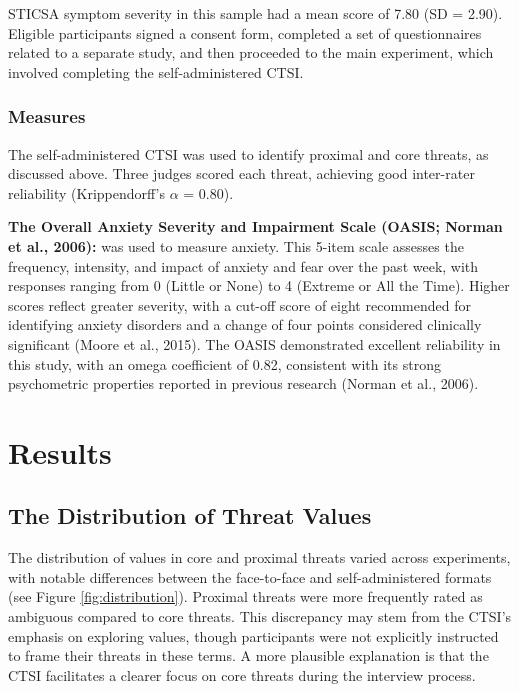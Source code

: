 \documentclass[
  man,floatsintext]{apa7}
\begin{document}
STICSA symptom severity in this sample had a mean score of 7.80 (SD = 2.90).
Eligible participants signed a consent form, completed a set of questionnaires related to a separate study, and then proceeded to the main experiment, which involved completing the self-administered CTSI.

\subsubsection{Measures}\label{measures-4}

The self-administered CTSI was used to identify proximal and core threats, as discussed above.
Three judges scored each threat, achieving good inter-rater reliability (Krippendorff's \(\alpha\) = 0.80).

\textbf{The Overall Anxiety Severity and Impairment Scale (OASIS; Norman et al., 2006):} was used to measure anxiety.
This 5-item scale assesses the frequency, intensity, and impact of anxiety and fear over the past week, with responses ranging from 0 (Little or None) to 4 (Extreme or All the Time).
Higher scores reflect greater severity, with a cut-off score of eight recommended for identifying anxiety disorders and a change of four points considered clinically significant (Moore et al., 2015).
The OASIS demonstrated excellent reliability in this study, with an omega coefficient of 0.82, consistent with its strong psychometric properties reported in previous research (Norman et al., 2006).

\section{Results}\label{results}

\subsection{The Distribution of Threat Values}\label{the-distribution-of-threat-values}

The distribution of values in core and proximal threats varied across experiments, with notable differences between the face-to-face and self-administered formats (see Figure \ref{fig:distribution}).
Proximal threats were more frequently rated as ambiguous compared to core threats.
This discrepancy may stem from the CTSI's emphasis on exploring values, though participants were not explicitly instructed to frame their threats in these terms.
A more plausible explanation is that the CTSI facilitates a clearer focus on core threats during the interview process.
\end{document}
